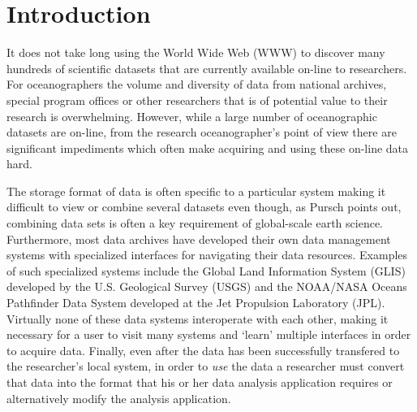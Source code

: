 \clearpage

\tableofcontents

\clearpage


\section {Introduction}

It does not take long using the World Wide Web (WWW) to discover many hundreds
of scientific datasets that are currently available on-line to researchers.
For oceanographers the volume and diversity of data from national archives,
special program offices or other researchers that is of potential value to
their research is overwhelming.  However, while a large number of oceanographic
datasets are on-line, from the research oceanographer's point of view there
are significant impediments which often make acquiring and using these
on-line data hard\cite{muntz:data}.

The storage format of data is often specific to a particular system making it
difficult to view or combine several datasets even though, as Pursch points
out, combining data sets is often a key requirement of global-scale earth
science\cite{pursch:newtools}. Furthermore, most data archives have developed
their own data management systems with specialized interfaces for navigating
their data resources. Examples of such specialized systems include the Global
Land Information System (GLIS)\cite{USGS:glisurl} developed by the
U.S. Geological Survey (USGS) and the NOAA/NASA Oceans Pathfinder Data System
developed at the Jet Propulsion Laboratory
(JPL)\cite{JPL:oceansurl}. Virtually none of these data systems interoperate
with each other, making it necessary for a user to visit many systems and
`learn' multiple interfaces in order to acquire data.  Finally, even after
the data has been successfully transfered to the researcher's local system,
in order to {\em use} the data a researcher must convert that data into the
format that his or her data analysis application requires or alternatively
modify the analysis application\cite{pursch:newtools}.

